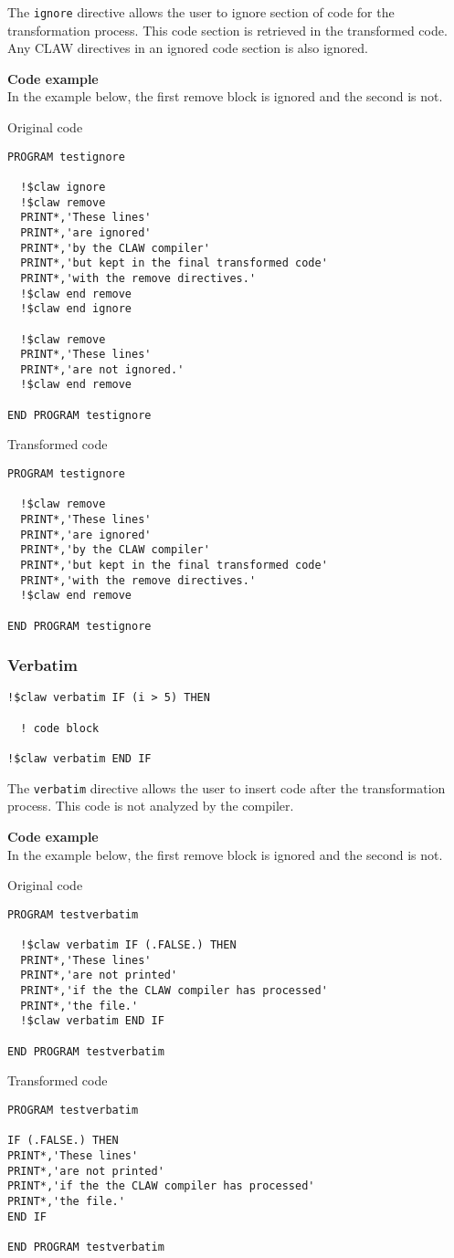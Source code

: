 The \lstinline!ignore! directive allows the user to ignore section of code
for the transformation process. This code section is retrieved in the 
transformed code. Any CLAW directives in an ignored code section is also
ignored.

\textbf{Code example}\\
\label{ignore1}
In the example below, the first remove block is ignored and the second is not.

Original code
\begin{lstlisting}
PROGRAM testignore

  !$claw ignore
  !$claw remove
  PRINT*,'These lines'
  PRINT*,'are ignored'
  PRINT*,'by the CLAW compiler'
  PRINT*,'but kept in the final transformed code'
  PRINT*,'with the remove directives.'
  !$claw end remove
  !$claw end ignore

  !$claw remove
  PRINT*,'These lines'
  PRINT*,'are not ignored.'
  !$claw end remove

END PROGRAM testignore
\end{lstlisting}

Transformed code
\begin{lstlisting}
PROGRAM testignore

  !$claw remove
  PRINT*,'These lines'
  PRINT*,'are ignored'
  PRINT*,'by the CLAW compiler'
  PRINT*,'but kept in the final transformed code'
  PRINT*,'with the remove directives.'
  !$claw end remove

END PROGRAM testignore
\end{lstlisting}

\subsubsection{Verbatim}
\begin{lstlisting}
!$claw verbatim IF (i > 5) THEN

  ! code block
  
!$claw verbatim END IF
\end{lstlisting}

The \lstinline!verbatim! directive allows the user to insert code after the
transformation process. This code is not analyzed by the compiler. 

\textbf{Code example}\\
\label{verbatim1}
In the example below, the first remove block is ignored and the second is not.

Original code
\begin{lstlisting}
PROGRAM testverbatim

  !$claw verbatim IF (.FALSE.) THEN
  PRINT*,'These lines'
  PRINT*,'are not printed'
  PRINT*,'if the the CLAW compiler has processed'
  PRINT*,'the file.'
  !$claw verbatim END IF

END PROGRAM testverbatim
\end{lstlisting}

Transformed code
\begin{lstlisting}
PROGRAM testverbatim

IF (.FALSE.) THEN
PRINT*,'These lines'
PRINT*,'are not printed'
PRINT*,'if the the CLAW compiler has processed'
PRINT*,'the file.'
END IF

END PROGRAM testverbatim
\end{lstlisting}

